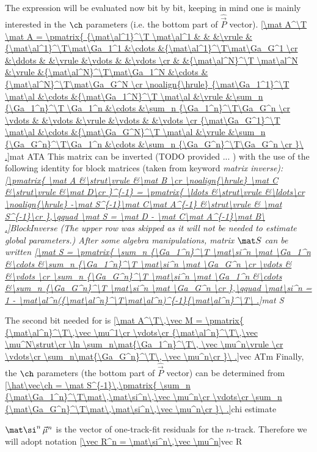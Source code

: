 The \rhs expression will be evaluated now bit by bit, keeping in mind one is mainly interested in the $\ch$ parameters (i.e. the bottom part of $\hat\vec P$ vector).
\eqref{\mat A^\T \mat A = \pmatrix{
{\mat\al^1}^\T \mat\al^1	&		&						&\vrule	&{\mat\al^1}^\T\mat\Ga_1^1	&\cdots	&{\mat\al^1}^\T\mat\Ga_G^1	\cr
					&\ddots	&						&\vrule	&\vdots					&		&\vdots					\cr
					&		&{\mat\al^N}^\T \mat\al^N		&\vrule	&{\mat\al^N}^\T\mat\Ga_1^N	&\cdots	&{\mat\al^N}^\T\mat\Ga_G^N	\cr
\noalign{\hrule}
{\mat\Ga_1^1}^\T \mat\al	&\cdots	&{\mat\Ga_1^N}^\T \mat\al	&\vrule	&\sum_n {\Ga_1^n}^\T \Ga_1^n	&\cdots	&\sum_n {\Ga_1^n}^\T\Ga_G^n	\cr
\vdots				&		&\vdots					&\vrule	&\vdots					&		&\vdots					\cr
{\mat\Ga_G^1}^\T \mat\al	&\cdots	&{\mat\Ga_G^N}^\T \mat\al	&\vrule	&\sum_n {\Ga_G^n}^\T\Ga_1^n	&\cdots	&\sum_n {\Ga_G^n}^\T\Ga_G^n	\cr
}\ .}{mat ATA}
This matrix can be inverted (TODO provided ... ) with the use of the following identity for block matrices (taken from  keyword \em{matrix inverse}):
\eqref{\pmatrix{
\mat A	&\strut\vrule	&\mat B	\cr
\noalign{\hrule}
\mat C	&\strut\vrule	&\mat D\cr
}^{-1} = \pmatrix{
\ldots							&\strut\vrule	&\ldots\cr
\noalign{\hrule}
-\mat S^{-1}\mat C\mat A^{-1}	&\strut\vrule	& \mat S^{-1}\cr
},\qquad \mat S = \mat D - \mat C\mat A^{-1}\mat B\ .}{BlockInverse}
(The upper row was skipped as it will not be needed to estimate global parameters.) After some algebra manipulations, matrix $\mat S$ can be written
\eqref{\mat S = \pmatrix{
\sum_n {\Ga_1^n}^\T \mat\si^n \mat \Ga_1^n	&\cdots	&\sum_n {\Ga_1^n}^\T \mat\si^n \mat \Ga_G^n	\cr
\vdots								&		&\vdots									\cr
\sum_n {\Ga_G^n}^\T \mat\si^n \mat \Ga_1^n	&\cdots	&\sum_n {\Ga_G^n}^\T \mat\si^n \mat \Ga_G^n	\cr
},\qquad \mat\si^n = 1 - \mat\al^n({\mat\al^n}^\T\mat\al^n)^{-1}{\mat\al^n}^\T\ .}{mat S}

The second bit needed for  is
\eqref{\mat A^\T\,\vec M = \pmatrix{
{\mat\al^n}^\T\,\vec \mu^1\cr
\vdots\cr
{\mat\al^n}^\T\,\vec \mu^N\strut\cr
\ln
\sum_n\mat{\Ga_1^n}^\T\, \vec \mu^n\vrule width0pt height15pt\cr
\vdots\cr
\sum_n\mat{\Ga_G^n}^\T\, \vec \mu^n\cr
}\ .}{vec ATm}
Finally, the $\ch$ parameters (the bottom part of $\hat\vec P$ vector) can be determined from
\eqref{\hat\vec\ch = \mat S^{-1}\,\pmatrix{
\sum_n {\mat\Ga_1^n}^\T\mat\,\mat\si^n\,\vec \mu^n\cr
\vdots\cr
\sum_n {\mat\Ga_G^n}^\T\mat\,\mat\si^n\,\vec \mu^n\cr
}\ .}{chi estimate}

$\mat\si^n\,\vec \mu^n$ is the vector of one-track-fit residuals for the $n$-track. Therefore we will adopt notation
\eqref{\vec R^n = \mat\si^n\,\vec \mu^n}{vec R}

